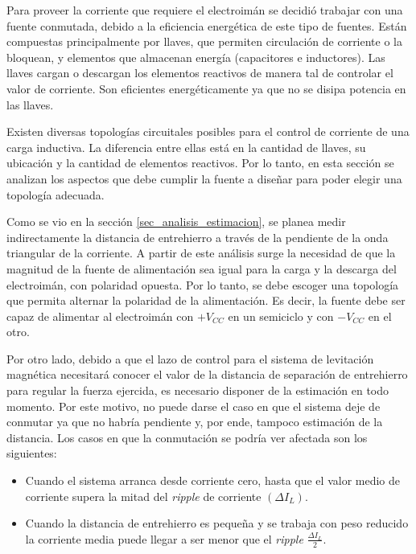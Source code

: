 Para proveer la corriente que requiere el electroimán se decidió trabajar con una fuente conmutada, debido a la eficiencia energética de este tipo de fuentes. Están compuestas principalmente por llaves, que permiten circulación de corriente o la bloquean, y elementos que almacenan energía (capacitores e inductores). Las llaves cargan o descargan los elementos reactivos de manera tal de controlar el valor de corriente. Son eficientes energéticamente ya que no se disipa potencia en las llaves.

Existen diversas topologías circuitales posibles para el control de corriente de una carga inductiva. La diferencia entre ellas está en la cantidad de llaves, su ubicación y la cantidad de elementos reactivos. Por lo tanto, en esta sección se analizan los aspectos que debe cumplir la fuente a diseñar para poder elegir una topología adecuada.

Como se vio en la sección \ref{sec_analisis_estimacion}, se planea medir indirectamente la distancia de entrehierro a través de la pendiente de la onda triangular de la corriente. A partir de este análisis surge la necesidad de que la magnitud de la fuente de alimentación sea igual para la carga y la descarga del electroimán, con polaridad opuesta. Por lo tanto, se debe escoger una topología que permita alternar la polaridad de la alimentación. Es decir, la fuente debe ser capaz de alimentar al electroimán con $+V_{CC}$  en un semiciclo y con $-V_{CC}$ en el otro.

Por otro lado, debido a que el lazo de control para el sistema de levitación magnética necesitará conocer el valor de la distancia de separación de entrehierro para regular la fuerza ejercida, es necesario disponer de la estimación en todo momento. Por este motivo, no puede darse el caso en que el sistema deje de conmutar ya que no habría pendiente y, por ende, tampoco estimación de la distancia. Los casos en que la conmutación se podría ver afectada son los siguientes: 
\begin{itemize} 
	\item Cuando el sistema arranca desde corriente cero, hasta que el valor medio de corriente supera la mitad del \textsl{ripple} de corriente $(\Delta I_{L})$.
	
	\item Cuando la distancia de entrehierro es pequeña y se trabaja con peso reducido la corriente media puede llegar a ser menor que el \textsl{ripple} $\frac{\Delta I_{L}}{2}$.
\end{itemize}

